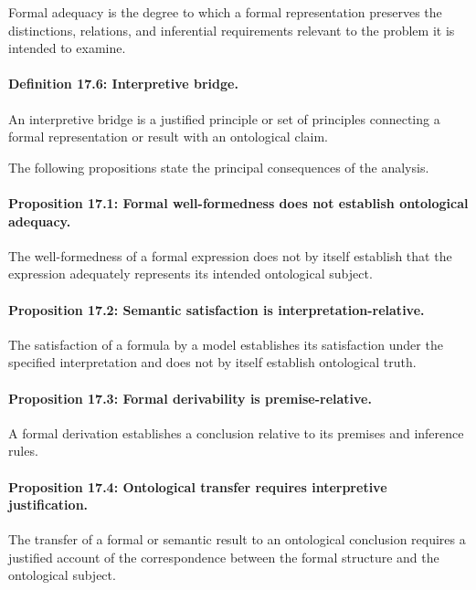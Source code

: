 Formal adequacy
is the
degree to
which a
formal representation
preserves the
distinctions,
relations,
and inferential
requirements relevant
to the
problem it
is intended
to examine.

\paragraph{Definition 17.6: Interpretive bridge.}

An interpretive
bridge is
a justified
principle or
set of
principles connecting
a formal
representation or
result with
an ontological
claim.

The following
propositions state
the principal
consequences of
the analysis.

\paragraph{Proposition 17.1: Formal well-formedness does not establish ontological adequacy.}

The well-formedness
of a
formal expression
does not
by itself
establish that
the expression
adequately represents
its intended
ontological subject.

\paragraph{Proposition 17.2: Semantic satisfaction is interpretation-relative.}

The satisfaction
of a
formula by
a model
establishes its
satisfaction under
the specified
interpretation and
does not
by itself
establish ontological
truth.

\paragraph{Proposition 17.3: Formal derivability is premise-relative.}

A formal
derivation establishes
a conclusion
relative to
its premises
and inference
rules.

\paragraph{Proposition 17.4: Ontological transfer requires interpretive justification.}

The transfer
of a
formal or
semantic result
to an
ontological conclusion
requires a
justified account
of the
correspondence between
the formal
structure and
the ontological
subject.

